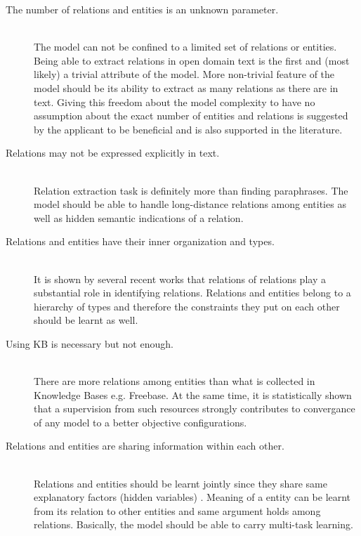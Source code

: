 \documentclass[12pt]{report}
\begin{document}
\begin{description}
  
  \item[The number of relations and entities is an unknown parameter.] \hfill \\
  The model can not be confined to a limited set of relations or entities. Being able to extract relations in
  open domain text is the first and (most likely) a trivial attribute of the model. More non-trivial feature
  of the model should be its ability to extract as many relations as there are in text. 
  Giving this freedom
  about the model complexity to have no assumption about the exact number of entities and relations
  is suggested by the applicant to be beneficial 
   and is also supported in the literature.

  \item[Relations may not be expressed explicitly in text.] \hfill \\
  Relation extraction task is definitely more than finding paraphrases. The model should be able to handle
  long-distance relations among entities as well as hidden semantic indications of a relation.
  

  \item[Relations and entities have their inner organization and types.] \hfill \\
  It is shown by several recent works that relations of relations play a substantial role in identifying
  relations. Relations and entities belong to a hierarchy of types and therefore the constraints they put on each other
  should be learnt as well.

  \item[Using KB is necessary but not enough.] \hfill \\
  There are more relations among entities than what is collected in 
  Knowledge Bases e.g. Freebase. At the same time, it is statistically shown that a supervision
  from such resources strongly contributes to convergance of any model to a better 
  objective configurations.

  \item[Relations and entities are sharing information within each other.] \hfill \\
  Relations and entities should be learnt jointly since they share same explanatory factors (hidden variables)
  . Meaning of a entity can be learnt from its relation to other entities and same argument holds among relations.
  Basically, the model should be able to carry multi-task learning. 
    
\end{description}
\end{document}
